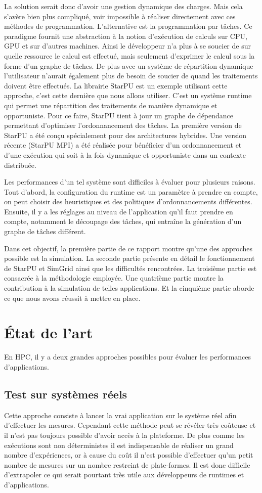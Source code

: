 \documentclass[smallextended]{svjour3}
\begin{document}
La solution serait donc d'avoir une gestion dynamique des
charges. Mais cela s'avère bien plus compliqué, voir impossible
à réaliser directement avec ces méthodes de
programmation. L'alternative est la programmation par tâches. Ce     
paradigme fournit une abstraction à la notion d'exécution de calculs sur CPU,
GPU et sur d'autres machines. Ainsi le développeur n'a plus à se
soucier de sur quelle ressource le calcul est effectué, mais
seulement d'exprimer le calcul sous la forme d'un graphe de
tâches. De plus avec un système de répartition dynamique
l'utilisateur n'aurait également plus de besoin de soucier de quand
les traitements doivent être effectués. La librairie
StarPU\cite{StarPU} est un exemple utilisant cette approche, c'est
cette dernière que nous allons utiliser. C'est un système runtime
qui permet une répartition des traitements de manière dynamique et
opportuniste. Pour ce faire, StarPU tient à jour un graphe de dépendance
permettant d'optimiser l'ordonnancement des tâches. La première
version de StarPU a été conçu spécialement pour des architectures
hybrides. Une version récente (StarPU MPI)\cite{StarPU-MPI} a été 
réalisée pour bénéficier d'un ordonnancement et d'une exécution qui
soit à la fois dynamique et opportuniste dans un contexte distribuée.

Les performances d'un tel système sont difficiles à évaluer pour
plusieurs raisons. Tout d'abord, la configuration du runtime
est un paramètre à prendre en compte, on peut choisir des
heuristiques et des politiques d'ordonnancements différentes.
Ensuite, il y a les réglages au niveau de l'application qu'il faut
prendre en compte, notamment le découpage des tâches, qui entraîne
la génération d'un graphe de tâches différent.

Dans cet objectif, la première partie de ce rapport montre qu'une
des approches possible est la simulation. La seconde partie
présente en détail le fonctionnement de StarPU et SimGrid 
ainsi que les difficultés rencontrées. La troisième partie est
consacrée à la méthodologie employée.  Une quatrième partie montre la
contribution à la simulation de telles applications.  Et la
cinquième partie aborde ce que nous avons réussit à mettre en place. 

\section{État de l'art}
\label{sec-2}
En HPC, il y a deux grandes approches possibles pour évaluer les
performances d'applications.
\subsection{Test sur systèmes réels}
\label{sec-2-1}
Cette approche consiste à lancer la vrai application sur le système
réel afin d'effectuer les mesures. Cependant cette méthode peut se 
révéler très coûteuse et il n'est pas toujours possible d'avoir
accès à la plateforme. De plus comme les exécutions sont non
déterministes il est indispensable de réaliser un grand nombre
d'expériences, or à cause du coût il n'est possible d'effectuer
qu'un petit nombre de mesures sur un nombre restreint de
plate-formes. Il est donc difficile d'extrapoler ce qui serait
pourtant très utile aux développeurs de runtimes et d'applications. 
\end{document}
